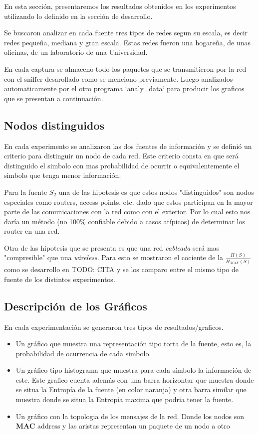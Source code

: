 En esta secci\'on, presentaremos los resultados obtenidos en los experimentos
utilizando lo definido en la secci\'on de desarrollo.

Se buscaron analizar en cada fuente tres tipos de redes segun su escala, es
decir redes pequeña, mediana y gran escala. Estas redes fueron
una hogareña, de unas oficinas, de un laboratorio de una Universidad.

En cada captura se almaceno todo los paquetes que se transmitieron
por la red con el sniffer desarollado como se menciono
previamente. Luego analizados automaticamente por el otro programa `analy\_data`
para producir los graficos que se presentan a continuación.

\subsection{Nodos distinguidos}

En cada experimento se analizaron las dos fuentes de información y se definió
un criterio para distinguir un nodo de cada red. Este criterio consta en que
será distinguido el simbolo con mas probabilidad de ocurrir o equivalentemente
el simbolo que tenga menor información.

Para la fuente $S_2$ una de las hipotesis es que estos nodos "distinguidos" son
nodos especiales como routers, access points, etc. dado que estos participan
en la mayor parte de las comunicaciones con la red como con el exterior.
Por lo cual esto nos daría un método (no 100\% confiable debido a casos
atípicos) de determinar los router en una red.

Otra de las hipotesis que se presenta es que una red \textit{cableada} será
mas "compresible" que una \textit{wireless}. Para esto se mostraron el
cociente de la $\frac{H(S)}{H_{MAX}(S)}$ como se desarrollo en TODO: CITA
y se los comparo entre el mismo tipo de fuente de los distintos experimentos.

\subsection{Descripción de los Gráficos}

En cada experimentación se generaron tres tipos de resultados/graficos.

\begin{itemize}
	\item Un gráfico que muestra una representación tipo torta de la fuente, esto es, la probabilidad de ocurrencia de cada simbolo.
	\item Un gráfico tipo histograma que muestra para cada símbolo la información de este. Este grafico cuenta además con una barra
	horizontar que muestra donde se situa la Entropía de la fuente (en color naranja) y otra barra similar que muestra donde
	se situa la Entropía maxima que podria tener la fuente.
	\item Un gráfico con la topologia de los mensajes de la red. Donde los nodos son \textbf{MAC} address y las
	aristas representan un paquete de un nodo a otro
\end{itemize}

